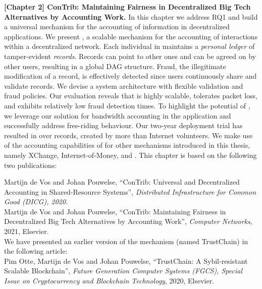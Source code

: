 \textbf{[Chapter 2] ConTrib: Maintaining Fairness in Decentralized Big Tech Alternatives by Accounting Work.}
In this chapter we address RQ1 and build a universal mechanism for the accounting of information in decentralized applications.
We present \TrustChain{}, a scalable mechanism for the accounting of interactions within a decentralized network.
Each individual in \TrustChain{} maintains a \emph{personal ledger} of tamper-evident \emph{records}.
Records can point to other ones and can be agreed on by other users, resulting in a global DAG structure.
Fraud, the illegitimate modification of a record, is effectively detected since users continuously share and validate records.
We devise a system architecture with flexible validation and fraud policies.
Our evaluation reveals that \TrustChain{} is highly scalable, tolerates packet loss, and exhibits relatively low fraud detection times.
To highlight the potential of \TrustChain{}, we leverage our solution for bandwidth accounting in the \Tribler{} application and successfully address free-riding behaviour.
Our two-year deployment trial has resulted in over \TrialRecords{} records, created by more than \TrialUsers{} Internet volunteers.
We make use of the accounting capabilities of \TrustChain{} for other mechanisms introduced in this thesis, namely XChange, Internet-of-Money, and \Dappcoder{}.
This chapter is based on the following two publications:

Martijn de Vos and Johan Pouwelse, \enquote{ConTrib: Universal and Decentralized Accounting in Shared-Resource Systems}, \emph{Distributed Infrastructure for Common Good (DICG), 2020.}\\

Martijn de Vos and Johan Pouwelse, \enquote{ConTrib: Maintaining Fairness in Decentralized Big Tech Alternatives by Accounting Work}, \emph{Computer Networks}, 2021, Elsevier.\\

\noindent We have presented an earlier version of the \TrustChain{} mechanism (named TrustChain) in the following article:\\

Pim Otte, Martijn de Vos and Johan Pouwelse, \enquote{TrustChain: A Sybil-resistant Scalable Blockchain}, \emph{Future Generation Computer Systems (FGCS), Special Issue on Cryptocurrency and Blockchain Technology}, 2020, Elsevier.\\

